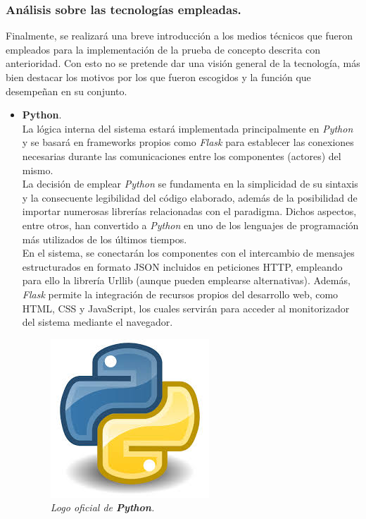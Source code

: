 \documentclass[../main.tex]{subfiles}
\begin{document}
\subsubsection{Análisis sobre las tecnologías empleadas.}\label{Análisis sobre las tecnologías empleadas}
Finalmente, se realizará una breve introducción a los medios técnicos que fueron empleados para la implementación de la prueba de concepto descrita con anterioridad. Con esto no se pretende dar una visión general de la tecnología, más bien destacar los motivos por los que fueron escogidos y la función que desempeñan en su conjunto.  
\\

\begin{itemize}

    \item \textbf{Python}. \\ 
    La lógica interna del sistema estará implementada principalmente en \textit{Python} y se basará en frameworks propios como \textit{Flask} para establecer las conexiones necesarias durante las comunicaciones entre los componentes (actores) del mismo. 
    \\ 
    
    La decisión de emplear \textit{Python} se fundamenta en la simplicidad de su sintaxis y la consecuente legibilidad del código elaborado, además de la posibilidad de importar numerosas librerías relacionadas con el paradigma. Dichos aspectos, entre otros, han convertido a \textit{Python} en uno de los lenguajes de programación más utilizados de los últimos tiempos. 
    \\ 
    
    En el sistema, se conectarán los componentes con el intercambio de mensajes estructurados en formato JSON incluidos en peticiones HTTP, empleando para ello la librería Urllib (aunque pueden emplearse alternativas). Además, \textit{Flask} permite la integración de recursos propios del desarrollo web, como HTML, CSS y JavaScript, los cuales servirán para acceder al monitorizador del sistema mediante el navegador. 
    \\
    
    \begin{figure}[htbp]
        \centering
        \includegraphics[width=0.25\linewidth]{images/technologies/python.jpg}
        \caption{\textit{Logo oficial de \textbf{Python}.}}
    \end{figure}
   

\end{itemize}
\end{document}
